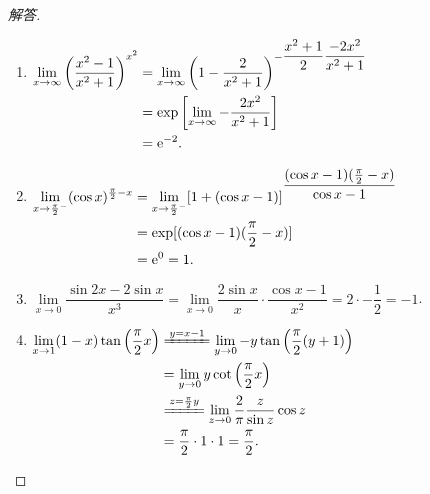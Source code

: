 \documentclass[a4paper,11pt,twoside]{ctexbook}
\newcommand{\e}{\mathrm e}
\begin{document}
\begin{enumerate}
\begin{proof}[解答]
\begin{enumerate}[(1)]
			      \item $\begin{aligned}[t]
					            \lim\limits_{x\to\infty} \left(\dfrac{x^2-1}{x^2+1}\right)^{x^2} & = \lim\limits_{x\to\infty} \left(1-\dfrac{2}{x^2+1}\right)^{-\dfrac{x^2+1}{2}\dfrac{-2x^2}{x^2+1}} \\
					                                                                             & ={\rm exp}\left[\lim\limits_{x\to\infty} -\dfrac{2x^2}{x^2+1}\right]                               \\
					                                                                             & =\e^{-2}.
				            \end{aligned}$

			      \item $\begin{aligned}[t]
					            \lim\limits_{x\to\frac{\pi}{2}^{-}} (\cos{x})^{\frac{\pi}{2}-x} & = \lim\limits_{x\to\frac{\pi}{2}^{-}} [1+(\cos{x}-1)]^{\dfrac{(\cos{x}-1)(\frac{\pi}{2}-x)}{\cos{x}-1}} \\
					                                                                            & = {\rm exp}[(\cos{x}-1)(\frac{\pi}{2}-x)]                                                               \\
					                                                                            & = \e^0=1.
				            \end{aligned}$

			      \item $\lim\limits_{x\to 0} \dfrac{\sin{2x}-2\sin{x}}{x^3} = \lim\limits_{x\to 0}\dfrac{2\sin{x}}{x}\cdot\dfrac{\cos{x}-1}{x^2}=2\cdot -\dfrac{1}{2}=-1$.

			      \item $\begin{aligned}[t]
					            \lim\limits_{x\to 1} (1-x)\tan\left(\dfrac{\pi}{2}x\right) & \xlongequal{y=x-1} \lim\limits_{y\to 0} -y\tan\left(\dfrac{\pi}{2}(y+1)\right)             \\
					                                                                       & = \lim\limits_{y\to 0} y\cot\left(\dfrac{\pi}{2}x\right)                                   \\
					                                                                       & \xlongequal{z=\frac{\pi}{2}y} \lim\limits_{z\to 0} \dfrac{2}{\pi}\dfrac{z}{\sin{z}}\cos{z} \\
					                                                                       & =\dfrac{\pi}{2}\cdot 1\cdot 1= \dfrac{\pi}{2}.
				            \end{aligned}$
		      \end{enumerate}
	      \end{proof}


\end{enumerate}
\end{document}
